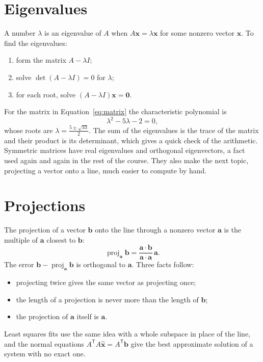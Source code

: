 \documentclass[10pt,twocolumn]{article}
\numberwithin{equation}{section}
\begin{document}
\section{Eigenvalues}

A number $\lambda$ is an eigenvalue of $A$ when $A\mathbf{x} = \lambda \mathbf{x}$ for
some nonzero vector $\mathbf{x}$. To find the eigenvalues:
\begin{enumerate}
  \item[(i)] form the matrix $A - \lambda I$;
  \item[(ii)] solve $\det(A - \lambda I) = 0$ for $\lambda$;
  \item[(iii)] for each root, solve $(A - \lambda I)\mathbf{x} = \mathbf{0}$.
\end{enumerate}
For the matrix in Equation~\eqref{eq:matrix} the characteristic polynomial is
\begin{equation}
  \lambda^2 - 5\lambda - 2 = 0 ,
  \label{eq:charpoly}
\end{equation}
whose roots are $\lambda = \frac{5 \pm \sqrt{33}}{2}$. The sum of the eigenvalues is the
trace of the matrix and their product is its determinant, which gives a quick check of
the arithmetic. Symmetric matrices have real eigenvalues and orthogonal eigenvectors,
a fact used again and again in the rest of the course. They also make the next topic,
projecting a vector onto a line, much easier to compute by hand.

\section{Projections}

The projection of a vector $\mathbf{b}$ onto the line through a nonzero vector
$\mathbf{a}$ is the multiple of $\mathbf{a}$ closest to $\mathbf{b}$:
\begin{equation}
  \operatorname{proj}_{\mathbf{a}} \mathbf{b}
    = \frac{\mathbf{a} \cdot \mathbf{b}}{\mathbf{a} \cdot \mathbf{a}} \, \mathbf{a} .
  \label{eq:projection}
\end{equation}
The error $\mathbf{b} - \operatorname{proj}_{\mathbf{a}} \mathbf{b}$ is orthogonal to
$\mathbf{a}$. Three facts follow:
\begin{itemize}
  \item projecting twice gives the same vector as projecting once;
  \item the length of a projection is never more than the length of $\mathbf{b}$;
  \item the projection of $\mathbf{a}$ itself is $\mathbf{a}$.
\end{itemize}
Least squares fits use the same idea with a whole subspace in place of the line, and
the normal equations $A^{\mathsf{T}} A \hat{\mathbf{x}} = A^{\mathsf{T}} \mathbf{b}$
give the best approximate solution of a system with no exact one.
\end{document}
